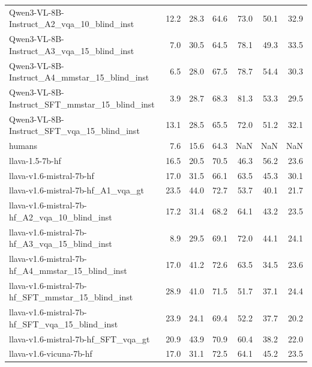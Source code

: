 \begin{tabular}{lrrrrrr}
Qwen3-VL-8B-Instruct_A2_vqa_10_blind_inst & 12.2 & 28.3 & 64.6 & 73.0 & 50.1 & 32.9 \\
Qwen3-VL-8B-Instruct_A3_vqa_15_blind_inst & 7.0 & 30.5 & 64.5 & 78.1 & 49.3 & 33.5 \\
Qwen3-VL-8B-Instruct_A4_mmstar_15_blind_inst & 6.5 & 28.0 & 67.5 & 78.7 & 54.4 & 30.3 \\
Qwen3-VL-8B-Instruct_SFT_mmstar_15_blind_inst & 3.9 & 28.7 & 68.3 & 81.3 & 53.3 & 29.5 \\
Qwen3-VL-8B-Instruct_SFT_vqa_15_blind_inst & 13.1 & 28.5 & 65.5 & 72.0 & 51.2 & 32.1 \\
humans & 7.6 & 15.6 & 64.3 & NaN & NaN & NaN \\
llava-1.5-7b-hf & 16.5 & 20.5 & 70.5 & 46.3 & 56.2 & 23.6 \\
llava-v1.6-mistral-7b-hf & 17.0 & 31.5 & 66.1 & 63.5 & 45.3 & 30.1 \\
llava-v1.6-mistral-7b-hf_A1_vqa_gt & 23.5 & 44.0 & 72.7 & 53.7 & 40.1 & 21.7 \\
llava-v1.6-mistral-7b-hf_A2_vqa_10_blind_inst & 17.2 & 31.4 & 68.2 & 64.1 & 43.2 & 23.5 \\
llava-v1.6-mistral-7b-hf_A3_vqa_15_blind_inst & 8.9 & 29.5 & 69.1 & 72.0 & 44.1 & 24.1 \\
llava-v1.6-mistral-7b-hf_A4_mmstar_15_blind_inst & 17.0 & 41.2 & 72.6 & 63.5 & 34.5 & 23.6 \\
llava-v1.6-mistral-7b-hf_SFT_mmstar_15_blind_inst & 28.9 & 41.0 & 71.5 & 51.7 & 37.1 & 24.4 \\
llava-v1.6-mistral-7b-hf_SFT_vqa_15_blind_inst & 23.9 & 24.1 & 69.4 & 52.2 & 37.7 & 20.2 \\
llava-v1.6-mistral-7b-hf_SFT_vqa_gt & 20.9 & 43.9 & 70.9 & 60.4 & 38.2 & 22.0 \\
llava-v1.6-vicuna-7b-hf & 17.0 & 31.1 & 72.5 & 64.1 & 45.2 & 23.5 \\
\bottomrule
\end{tabular}
